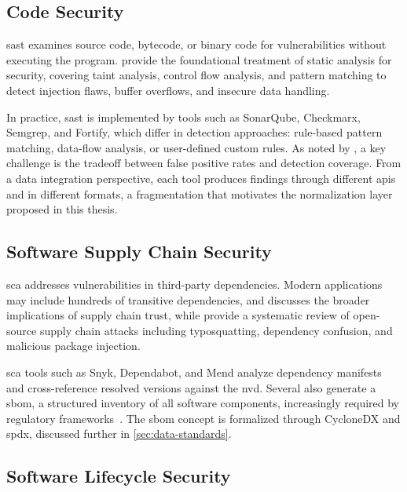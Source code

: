 \subsection{Code Security}
\label{sec:code-security}

\Gls{sast} examines source code, bytecode, or binary code for vulnerabilities without executing the program. \textcite{Chess2007} provide the foundational treatment of static analysis for security, covering taint analysis, control flow analysis, and pattern matching to detect injection flaws, buffer overflows, and insecure data handling.

In practice, \gls{sast} is implemented by tools such as SonarQube, Checkmarx, Semgrep, and Fortify, which differ in detection approaches: rule-based pattern matching, data-flow analysis, or user-defined custom rules. As noted by \textcite{Chess2007}, a key challenge is the tradeoff between false positive rates and detection coverage. From a data integration perspective, each tool produces findings through different \glspl{api} and in different formats, a fragmentation that motivates the normalization layer proposed in this thesis.

\subsection{Software Supply Chain Security}
\label{sec:supply-chain-security}

\Gls{sca} addresses vulnerabilities in third-party dependencies. Modern applications may include hundreds of transitive dependencies, and \textcite{Anderson2020} discusses the broader implications of supply chain trust, while \textcite{Ohm2020} provide a systematic review of open-source supply chain attacks including typosquatting, dependency confusion, and malicious package injection.

\gls{sca} tools such as Snyk, Dependabot, and Mend analyze dependency manifests and cross-reference resolved versions against the \gls{nvd}. Several also generate a \gls{sbom}, a structured inventory of all software components, increasingly required by regulatory frameworks~\parencite{NTIA2021}. The \gls{sbom} concept is formalized through CycloneDX and \gls{spdx}, discussed further in \autoref{sec:data-standards}.

\subsection{Software Lifecycle Security}
\label{sec:lifecycle-security}

